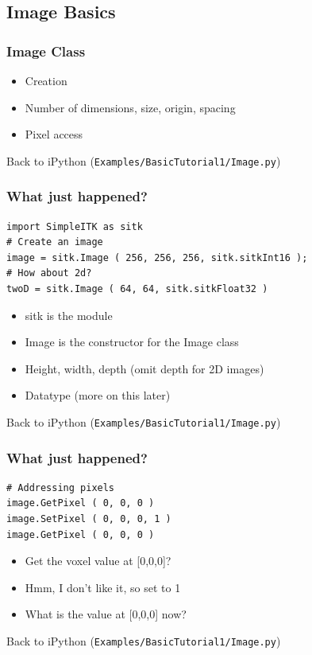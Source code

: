 \subsection{Image Basics}

\begin{frame}
\frametitle{Image Class}
\begin{itemize}
  \item Creation
  \item Number of dimensions, size, origin, spacing
  \item Pixel access
\end{itemize}
Back to iPython (\texttt{Examples/BasicTutorial1/Image.py})
\end{frame}

\begin{frame}[fragile]
\frametitle{What just happened?}
\lstpython
\begin{lstlisting}
import SimpleITK as sitk
# Create an image
image = sitk.Image ( 256, 256, 256, sitk.sitkInt16 );
# How about 2d?
twoD = sitk.Image ( 64, 64, sitk.sitkFloat32 )
\end{lstlisting}

\begin{itemize}
  \item sitk is the module
  \item Image is the constructor for the Image class
  \item Height, width, depth (omit depth for 2D images)
  \item Datatype (more on this later)
\end{itemize}
Back to iPython (\texttt{Examples/BasicTutorial1/Image.py})
\end{frame}


\begin{frame}[fragile]
\frametitle{What just happened?}
\lstpython
\begin{lstlisting}
# Addressing pixels
image.GetPixel ( 0, 0, 0 )
image.SetPixel ( 0, 0, 0, 1 )
image.GetPixel ( 0, 0, 0 )
\end{lstlisting}
\begin{itemize}
  \item Get the voxel value at [0,0,0]?
  \item Hmm, I don't like it, so set to 1
  \item What is the value at [0,0,0] now?
\end{itemize}
Back to iPython (\texttt{Examples/BasicTutorial1/Image.py})
\end{frame}

